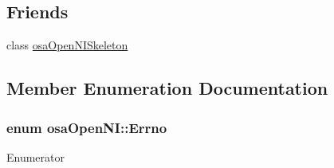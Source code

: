 \subsection*{Friends}
\begin{DoxyCompactItemize}
\item 
class \hyperlink{classosa_open_n_i_a7c2cdffe82d515f12a725b676dd0080b}{osa\-Open\-N\-I\-Skeleton}
\end{DoxyCompactItemize}


\subsection{Member Enumeration Documentation}
\hypertarget{classosa_open_n_i_a9f02bd17e25b1ee362b08c5620e307db}{
\subsubsection[{Errno}]{\setlength{\rightskip}{0pt plus 5cm}enum {\bf osa\-Open\-N\-I\-::\-Errno}}}\label{classosa_open_n_i_a9f02bd17e25b1ee362b08c5620e307db}
\begin{Desc}
\item[Enumerator]\par
\begin{description}
\item[{\em 
\hypertarget{classosa_open_n_i_a9f02bd17e25b1ee362b08c5620e307dba78d51d697ce0176897623cb3094bb2b2}{E\-S\-U\-C\-C\-E\-S\-S}\label{classosa_open_n_i_a9f02bd17e25b1ee362b08c5620e307dba78d51d697ce0176897623cb3094bb2b2}
}]\item[{\em 
\hypertarget{classosa_open_n_i_a9f02bd17e25b1ee362b08c5620e307dba4eb89ca8c5addf282144176f9d013b57}{E\-F\-A\-I\-L\-U\-R\-E}\label{classosa_open_n_i_a9f02bd17e25b1ee362b08c5620e307dba4eb89ca8c5addf282144176f9d013b57}
}]\end{description}
\end{Desc}


